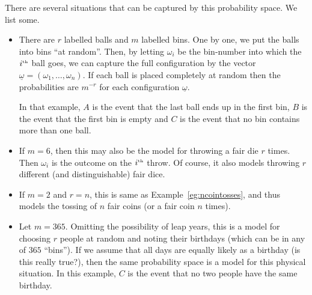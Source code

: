 \documentclass[preprint,  11pt]{amsart}
\newcommand{\para}[1]{\vspace{4mm}\noindent{\bfseries #1:}}
\theoremstyle{plain} %
\theoremstyle{definition} %
\begin{document}
\para{Example~\ref{eg:rballsinmbins}} There are several situations that can be captured by this probability space. We list some.
\begin{itemize}\setlength\itemsep{3pt}
\item There are $r$ labelled balls and $m$ labelled bins. One by one, we put the balls into bins ``at random''. Then, by letting $\omega_{i}$ be the bin-number into which the $i^{\mbox{\tiny th}}$ ball goes, we can capture the full configuration by the vector $\underline{\omega}=(\omega_{1},\ldots ,\omega_{n})$. If each ball is placed completely at random then the probabilities are $m^{-r}$ for each configuration $\underline{\omega}$. 

In that example, $A$ is the event that the last ball ends up in the first bin, $B$ is the event that the first bin is empty and $C$ is the event that no bin contains more than one ball. 
\item If $m=6$, then this may also be the model for throwing a fair die $r$ times. Then $\omega_{i}$ is the outcome on the $i^{\mbox{\tiny th}}$ throw. Of course, it also models throwing $r$ different (and distinguishable) fair dice.
\item If $m=2$ and $r=n$, this is same as Example~\ref{eg:ncointosses}, and thus models the tossing of $n$ fair coins (or a fair coin $n$ times).
\item Let $m=365$. Omitting the possibility of leap years, this is a model for choosing $r$ people at random and noting their birthdays (which can be in any of $365$ ``bins''). If we assume that all days are equally likely as a birthday (is this really true?), then the same probability space is a model for this physical situation. In this example, $C$ is the event that no two people have the same birthday.
\end{itemize}
\end{document}
